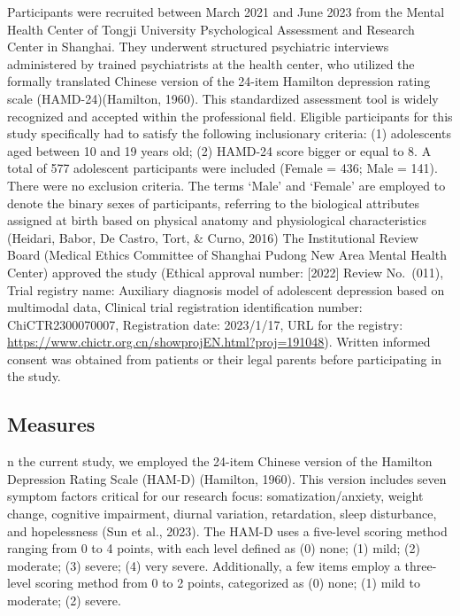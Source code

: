 \documentclass[
  man,floatsintext]{apa6}
\begin{document}
Participants were recruited between March 2021 and June 2023 from the Mental Health Center of Tongji University Psychological Assessment and Research Center in Shanghai. They underwent structured psychiatric interviews administered by trained psychiatrists at the health center, who utilized the formally translated Chinese version of the 24-item Hamilton depression rating scale (HAMD-24)(Hamilton, 1960). This standardized assessment tool is widely recognized and accepted within the professional field. Eligible participants for this study specifically had to satisfy the following inclusionary criteria: (1) adolescents aged between 10 and 19 years old; (2) HAMD-24 score bigger or equal to 8. A total of 577 adolescent participants were included (Female = 436; Male = 141). There were no exclusion criteria. The terms `Male' and `Female' are employed to denote the binary sexes of participants, referring to the biological attributes assigned at birth based on physical anatomy and physiological characteristics (Heidari, Babor, De Castro, Tort, \& Curno, 2016) The Institutional Review Board (Medical Ethics Committee of Shanghai Pudong New Area Mental Health Center) approved the study (Ethical approval number: {[}2022{]} Review No.~(011), Trial registry name: Auxiliary diagnosis model of adolescent depression based on multimodal data, Clinical trial registration identification number: ChiCTR2300070007, Registration date: 2023/1/17, URL for the registry: \url{https://www.chictr.org.cn/showprojEN.html?proj=191048}). Written informed consent was obtained from patients or their legal parents before participating in the study.

\hypertarget{measures}{%
\subsection{Measures}\label{measures}}

n the current study, we employed the 24-item Chinese version of the Hamilton Depression Rating Scale (HAM-D) (Hamilton, 1960). This version includes seven symptom factors critical for our research focus: somatization/anxiety, weight change, cognitive impairment, diurnal variation, retardation, sleep disturbance, and hopelessness (Sun et al., 2023). The HAM-D uses a five-level scoring method ranging from 0 to 4 points, with each level defined as (0) none; (1) mild; (2) moderate; (3) severe; (4) very severe. Additionally, a few items employ a three-level scoring method from 0 to 2 points, categorized as (0) none; (1) mild to moderate; (2) severe.
\end{document}

